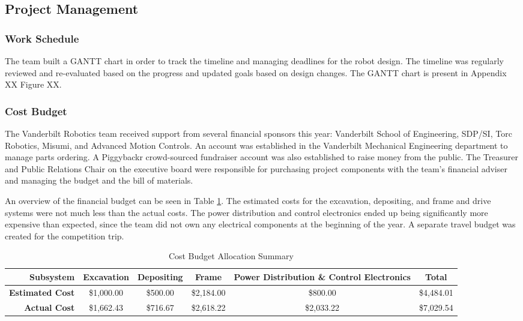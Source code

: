 \documentclass[class=article, crop=false]{standalone}
\begin{document}
	\subsection{Project Management}
	\label{subsec:project_management}
	
	\subsubsection{Work Schedule}
	The team built a GANTT chart in order to track the timeline and managing deadlines for the robot design. The timeline was regularly reviewed and re-evaluated based on the progress and updated goals based on design changes. The GANTT chart is present in Appendix XX Figure XX.

	
	\subsubsection{Cost Budget}
	
	The Vanderbilt Robotics team received support from several financial sponsors this year: Vanderbilt School of Engineering, SDP/SI, Torc Robotics, Misumi, and Advanced Motion Controls. An account was established in the Vanderbilt Mechanical Engineering department to manage parts ordering. A Piggybackr crowd-sourced fundraiser account was also established to raise money from the public. The Treasurer and Public Relations Chair on the executive board were responsible for purchasing project components with the team’s financial adviser and managing the budget and the bill of materials. 
	
	An overview of the financial budget can be seen in Table \ref{table:cost_budget}. The estimated costs for the excavation, depositing, and frame and drive systems were not much less than the actual costs. The power distribution and control electronics ended up being significantly more expensive than expected, since the team did not own any electrical components at the beginning of the year. A separate travel budget was created for the competition trip. 
	
	\FloatBarrier
	\begin{table}[h]
	\scriptsize
	\centering
	\begin{tabular}{ | r | c | c | c | c | c | }
 	\hline		
 	\rowcolor[gray]{0.8}
 		\textbf{Subsystem} & \textbf{Excavation} & \textbf{Depositing} & \textbf{Frame} & \textbf{Power Distribution \& Control Electronics} & \textbf{Total} \\
 		\hline\hline
 		\textbf{Estimated Cost} & \$1,000.00 & \$500.00 & \$2,184.00 & \$800.00 &  \$4,484.01 \\
	\hline
		\textbf{Actual Cost} & \$1,662.43 & \$716.67 & \$2,618.22 & \$2,033.22 & \$7,029.54 \\
	\hline
	\end{tabular}
	\caption{Cost Budget Allocation Summary}
		\label{table:cost_budget}
	\end{table}
	\FloatBarrier
	
\end{document}

